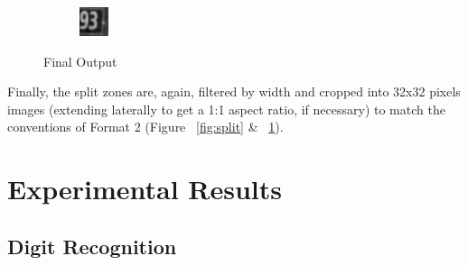 \documentclass{article} %
\begin{document}
\begin{figure}
\begin{subfigure}{.3\textwidth}
\end{subfigure}
\begin{subfigure}{.3\textwidth}
  \centering
  \includegraphics[width=.8\linewidth]{images/image01}
\end{subfigure}
\caption{Final Output}
\label{fig:output}
\end{figure}

Finally, the split zones are, again, filtered by width and cropped into 32x32 pixels images (extending laterally to get a 1:1 aspect ratio, if necessary) to match the conventions of Format 2 (Figure ~\ref{fig:split} \& ~\ref{fig:output}). 


\section{Experimental Results}
\subsection{Digit Recognition}
\end{document}
